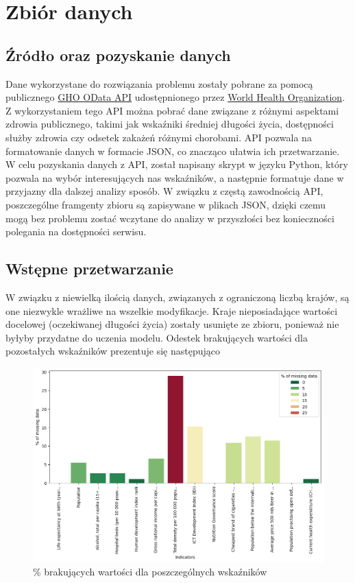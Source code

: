 \documentclass{article}
\begin{document}
\pagebreak

\section{Zbiór danych}
\subsection{Źródło oraz pozyskanie danych}
Dane wykorzystane do rozwiązania problemu zostały pobrane za pomocą publicznego \href{https://www.who.int/data/gho/info/gho-odata-api}{GHO OData API} 
udostępnionego przez \href{https://www.who.int}{World Health Organization}. Z wykorzystaniem tego API można pobrać dane związane z różnymi aspektami zdrowia publicznego, takimi jak
wskaźniki średniej długości życia, dostępności służby zdrowia czy odsetek zakażeń różnymi chorobami. API pozwala na formatowanie danych w formacie JSON, co
znacząco ułatwia ich przetwarzanie. W celu pozyskania danych z API, został napisany skrypt w języku Python, który pozwala na wybór interesujących nas wskaźników, a następnie formatuje dane
w przyjazny dla dalszej analizy sposób. W związku z częstą zawodnością API, poszczególne framgenty zbioru są zapisywane w plikach JSON, dzięki czemu mogą bez problemu zostać wczytane
do analizy w przyszłości bez konieczności polegania na dostępności serwisu.
\subsection{Wstępne przetwarzanie}
W związku z niewielką ilością danych, związanych z ograniczoną liczbą krajów, są one niezwykle wrażliwe na wszelkie modyfikacje.
Kraje nieposiadające wartości docelowej (oczekiwanej długości życia) zostały usunięte ze zbioru, ponieważ nie byłyby przydatne do uczenia modelu.
Odestek brakujących wartości dla pozostałych wskaźników prezentuje się następująco

\begin{figure}[H]
    \label{fig:missing_values}
    \includegraphics[width=\textwidth]{graphs/missing_values.png}
    \caption{\% brakujących wartości dla poszczególnych wskaźników}
    \centering
\end{figure}
\end{document}

